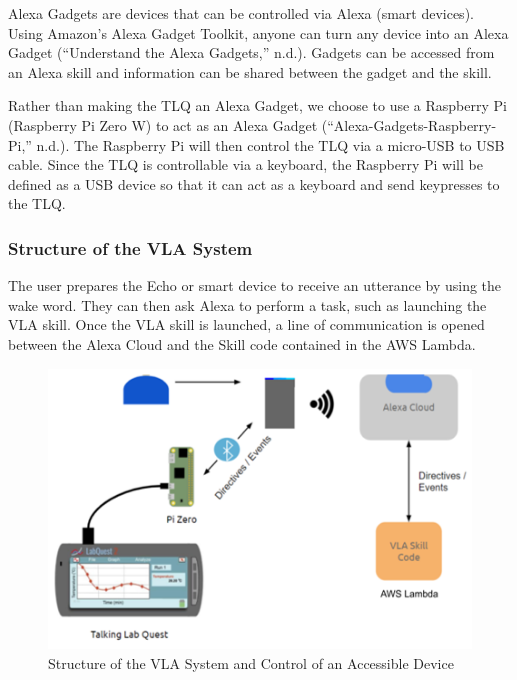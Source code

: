 \documentclass[11.5pt]{sig-alternate} %
\begin{document}
\begin{large}
Alexa Gadgets are devices that can be controlled via Alexa (smart devices). Using Amazon’s Alexa Gadget Toolkit, anyone can turn any device into an Alexa Gadget (“Understand the Alexa Gadgets,” n.d.). Gadgets can be accessed from an Alexa skill and information can be shared between the gadget and the skill.

Rather than making the TLQ an Alexa Gadget, we choose to use a Raspberry Pi (Raspberry Pi Zero W) to act as an Alexa Gadget (“Alexa-Gadgets-Raspberry-Pi,” n.d.). The Raspberry Pi will then control the TLQ via a micro-USB to USB cable. Since the TLQ is controllable via a keyboard, the Raspberry Pi will be defined as a USB device so that it can act as a keyboard and send keypresses to the TLQ. 

\subsubsection*{Structure of the VLA System}

The user prepares the Echo or smart device to receive an utterance by using the wake word. They can then ask Alexa to perform a task, such as launching the VLA skill. Once the VLA skill is launched, a line of communication is opened between the Alexa Cloud and the Skill code contained in the AWS Lambda.

\begin{figure}[!h]
    \centering
    \includegraphics[width=1\linewidth]{fig2.png}
    \caption{Structure of the VLA System and Control of an Accessible Device}
\end{figure}


\end{large}
\end{document}

